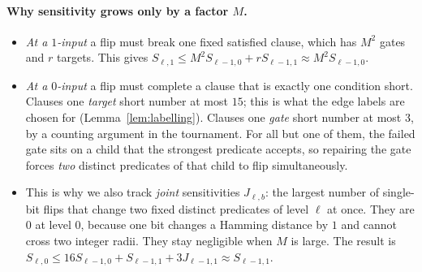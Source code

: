 \documentclass[11pt]{article}
\theoremstyle{definition}
\theoremstyle{remark}
\begin{document}
\paragraph{Why sensitivity grows only by a factor \(M\).}
\begin{itemize}[leftmargin=*]
\item \emph{At a \(1\)-input} a flip must break one fixed satisfied clause, which has \(M^2\) gates and \(r\) targets. This gives \(S_{\ell,1}\le M^2S_{\ell-1,0}+rS_{\ell-1,1}\approx M^2S_{\ell-1,0}\).
\item \emph{At a \(0\)-input} a flip must complete a clause that is exactly one condition short. Clauses one \emph{target} short number at most \(15\); this is what the edge labels are chosen for (Lemma~\ref{lem:labelling}). Clauses one \emph{gate} short number at most \(3\), by a counting argument in the tournament. For all but one of them, the failed gate sits on a child that the strongest predicate accepts, so repairing the gate forces \emph{two} distinct predicates of that child to flip simultaneously.
\item This is why we also track \emph{joint} sensitivities \(J_{\ell,b}\): the largest number of single-bit flips that change two fixed distinct predicates of level \(\ell\) at once. They are \(0\) at level \(0\), because one bit changes a Hamming distance by \(1\) and cannot cross two integer radii. They stay negligible when \(M\) is large. The result is \(S_{\ell,0}\le16S_{\ell-1,0}+S_{\ell-1,1}+3J_{\ell-1,1}\approx S_{\ell-1,1}\).
\end{itemize}
\end{document}
